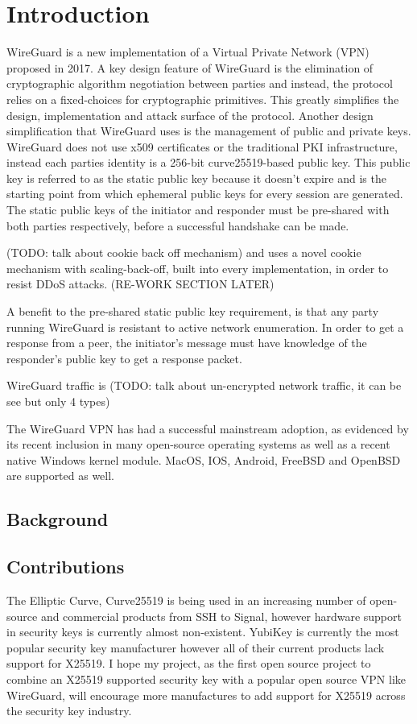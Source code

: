 \documentclass [11pt, proquest] {uwthesis}[2020/02/24]
\begin{document}
\textpages

\chapter {Introduction}
WireGuard is a new implementation of a Virtual Private Network (VPN) proposed in 2017. A key design feature of WireGuard is the elimination of cryptographic algorithm negotiation between parties and instead, the protocol relies on a fixed-choices for cryptographic primitives. This greatly simplifies the design, implementation and attack surface of the protocol. Another design simplification that WireGuard uses is the management of public and private keys. WireGuard does not use x509 certificates or the traditional PKI infrastructure, instead each parties identity is a 256-bit curve25519-based public key. This public key is referred to as the static public key because it doesn't expire and is the starting point from which ephemeral public keys for every session are generated. The static public keys of the initiator and responder must be pre-shared with both parties respectively, before a successful handshake can be made. 

(TODO: talk about cookie back off mechanism) and uses a novel cookie mechanism with scaling-back-off, built into every implementation, in order to resist DDoS attacks. (RE-WORK SECTION LATER)

A benefit to the pre-shared static public key requirement, is that any party running WireGuard is resistant to active network enumeration. In order to get a response from a peer, the initiator's message must have knowledge of the responder's public key to get a response packet. 

WireGuard traffic is (TODO: talk about un-encrypted network traffic, it can be see but only 4 types)

The WireGuard VPN has had a successful mainstream adoption, as evidenced by its recent inclusion in many 
open-source operating systems\cite{donenfeld_wireguard_nodate} as well as a recent native Windows kernel module\cite{noauthor_wireguard-nt_nodate}. MacOS, IOS, Android, FreeBSD and OpenBSD are supported as well.



\section {Background}


\section {Contributions}
The Elliptic Curve, Curve25519 is being used in an increasing number of open-source and commercial products\cite{noauthor_things_nodate-1} from SSH to Signal, however hardware support in 
security keys is currently almost non-existent. YubiKey is currently the most popular security key manufacturer however all of their current products 
lack support for X25519. I hope my project, as the first open source project to combine an X25519 supported security key with a popular open source VPN like WireGuard, will encourage more manufactures to add support for X25519 across the security key industry.
\end{document}
